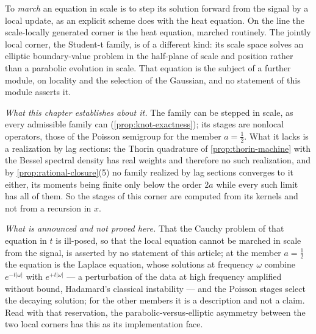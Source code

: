\begin{remark}\label{rem:cannot-march}
To \emph{march} an equation in scale is to step its solution forward from the signal by a local
update, as an explicit scheme does with the heat equation. On the line the scale-locally generated
corner is the heat equation, marched routinely. The
jointly local corner, the Student-t family, is of a different kind: its scale space solves an
elliptic boundary-value problem in the half-plane of scale and position rather than a parabolic
evolution in scale. That equation is the subject of a further module, on locality and the
selection of the Gaussian, and no statement of this module asserts it.

\emph{What this chapter establishes about it.} The family can be stepped in scale, as every
admissible family can (\ref{prop:knot-exactness}); its stages are nonlocal operators, those of the
Poisson semigroup for the member $a = \tfrac12$. What it lacks is a realization by lag sections:
the Thorin quadrature of \ref{prop:thorin-machine} with the Bessel spectral density has real
weights and therefore no such realization, and by \ref{prop:rational-closure}(5) no family
realized by lag sections converges to it either, its moments being finite only below the order
$2a$ while every such limit has all of them. So the stages of this corner are computed from its
kernels and not from a recursion in $x$.

\emph{What is announced and not proved here.} That the Cauchy problem of that equation in $t$ is
ill-posed, so that the local equation cannot be marched in scale from the signal, is asserted by no
statement of this article; at the member $a = \tfrac12$ the equation is the Laplace equation, whose
solutions at frequency $\omega$ combine $e^{-t|\omega|}$ with $e^{+t|\omega|}$ --- a perturbation of
the data at high frequency amplified without bound, Hadamard's classical instability --- and the
Poisson stages select the decaying solution; for the other members it is a description and not a
claim. Read with that reservation, the parabolic-versus-elliptic asymmetry between the two local
corners has this as its implementation face.
\end{remark}


